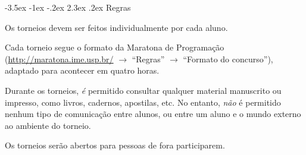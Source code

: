 \documentclass{UnBExam}%
\makeatletter
\renewcommand\section{\@startsection{section}{1}{\z@}%
	{-3.5ex \@plus -1ex \@minus -.2ex}%
	{2.3ex \@plus.2ex}%
	{\normalfont\normalsize\bfseries}}%
\newenvironment{my_itemize}%
{\begin{itemize}%
  \vspace{-0.3\baselineskip}
  \setlength{\itemsep}{1pt}%
  \setlength{\parskip}{0pt}%
  \setlength{\parsep}{0pt}}%
{\end{itemize}}
\makeatother
\begin{document}
	\section{Regras}%
		\begin{my_itemize}
			\item Os torneios devem ser feitos individualmente por cada aluno.
			\item Cada torneio segue o formato da Maratona de Programação (\url{http://maratona.ime.usp.br/} $\rightarrow$ ``Regras'' $\rightarrow$ ``Formato do concurso''), adaptado para acontecer em quatro horas.
			\item Durante os torneios, \emph{é} permitido consultar qualquer material manuscrito ou impresso, como livros, cadernos, apostilas, etc. No entanto, \emph{não} é permitido nenhum tipo de comunicação entre alunos, ou entre um aluno e o mundo externo ao ambiente do torneio.
			\item Os torneios serão abertos para pessoas de fora participarem.
		\end{my_itemize}
 \vspace{-0.3cm}
\end{document}
